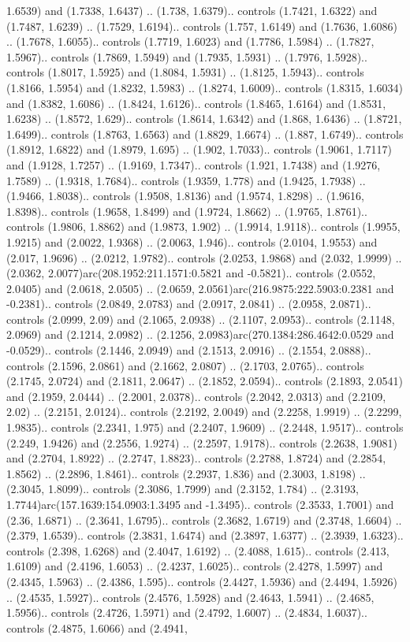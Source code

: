 1.6539) and (1.7338, 1.6437) .. (1.738, 1.6379).. controls (1.7421, 1.6322) and (1.7487, 1.6239) .. (1.7529, 1.6194).. controls (1.757, 1.6149) and (1.7636, 1.6086) .. (1.7678, 1.6055).. controls (1.7719, 1.6023) and (1.7786, 1.5984) .. (1.7827, 1.5967).. controls (1.7869, 1.5949) and (1.7935, 1.5931) .. (1.7976, 1.5928).. controls (1.8017, 1.5925) and (1.8084, 1.5931) .. (1.8125, 1.5943).. controls (1.8166, 1.5954) and (1.8232, 1.5983) .. (1.8274, 1.6009).. controls (1.8315, 1.6034) and (1.8382, 1.6086) .. (1.8424, 1.6126).. controls (1.8465, 1.6164) and (1.8531, 1.6238) .. (1.8572, 1.629).. controls (1.8614, 1.6342) and (1.868, 1.6436) .. (1.8721, 1.6499).. controls (1.8763, 1.6563) and (1.8829, 1.6674) .. (1.887, 1.6749).. controls (1.8912, 1.6822) and (1.8979, 1.695) .. (1.902, 1.7033).. controls (1.9061, 1.7117) and (1.9128, 1.7257) .. (1.9169, 1.7347).. controls (1.921, 1.7438) and (1.9276, 1.7589) .. (1.9318, 1.7684).. controls (1.9359, 1.778) and (1.9425, 1.7938) .. (1.9466, 1.8038).. controls (1.9508, 1.8136) and (1.9574, 1.8298) .. (1.9616, 1.8398).. controls (1.9658, 1.8499) and (1.9724, 1.8662) .. (1.9765, 1.8761).. controls (1.9806, 1.8862) and (1.9873, 1.902) .. (1.9914, 1.9118).. controls (1.9955, 1.9215) and (2.0022, 1.9368) .. (2.0063, 1.946).. controls (2.0104, 1.9553) and (2.017, 1.9696) .. (2.0212, 1.9782).. controls (2.0253, 1.9868) and (2.032, 1.9999) .. (2.0362, 2.0077)arc(208.1952:211.1571:0.5821 and -0.5821).. controls (2.0552, 2.0405) and (2.0618, 2.0505) .. (2.0659, 2.0561)arc(216.9875:222.5903:0.2381 and -0.2381).. controls (2.0849, 2.0783) and (2.0917, 2.0841) .. (2.0958, 2.0871).. controls (2.0999, 2.09) and (2.1065, 2.0938) .. (2.1107, 2.0953).. controls (2.1148, 2.0969) and (2.1214, 2.0982) .. (2.1256, 2.0983)arc(270.1384:286.4642:0.0529 and -0.0529).. controls (2.1446, 2.0949) and (2.1513, 2.0916) .. (2.1554, 2.0888).. controls (2.1596, 2.0861) and (2.1662, 2.0807) .. (2.1703, 2.0765).. controls (2.1745, 2.0724) and (2.1811, 2.0647) .. (2.1852, 2.0594).. controls (2.1893, 2.0541) and (2.1959, 2.0444) .. (2.2001, 2.0378).. controls (2.2042, 2.0313) and (2.2109, 2.02) .. (2.2151, 2.0124).. controls (2.2192, 2.0049) and (2.2258, 1.9919) .. (2.2299, 1.9835).. controls (2.2341, 1.975) and (2.2407, 1.9609) .. (2.2448, 1.9517).. controls (2.249, 1.9426) and (2.2556, 1.9274) .. (2.2597, 1.9178).. controls (2.2638, 1.9081) and (2.2704, 1.8922) .. (2.2747, 1.8823).. controls (2.2788, 1.8724) and (2.2854, 1.8562) .. (2.2896, 1.8461).. controls (2.2937, 1.836) and (2.3003, 1.8198) .. (2.3045, 1.8099).. controls (2.3086, 1.7999) and (2.3152, 1.784) .. (2.3193, 1.7744)arc(157.1639:154.0903:1.3495 and -1.3495).. controls (2.3533, 1.7001) and (2.36, 1.6871) .. (2.3641, 1.6795).. controls (2.3682, 1.6719) and (2.3748, 1.6604) .. (2.379, 1.6539).. controls (2.3831, 1.6474) and (2.3897, 1.6377) .. (2.3939, 1.6323).. controls (2.398, 1.6268) and (2.4047, 1.6192) .. (2.4088, 1.615).. controls (2.413, 1.6109) and (2.4196, 1.6053) .. (2.4237, 1.6025).. controls (2.4278, 1.5997) and (2.4345, 1.5963) .. (2.4386, 1.595).. controls (2.4427, 1.5936) and (2.4494, 1.5926) .. (2.4535, 1.5927).. controls (2.4576, 1.5928) and (2.4643, 1.5941) .. (2.4685, 1.5956).. controls (2.4726, 1.5971) and (2.4792, 1.6007) .. (2.4834, 1.6037).. controls (2.4875, 1.6066) and (2.4941, 